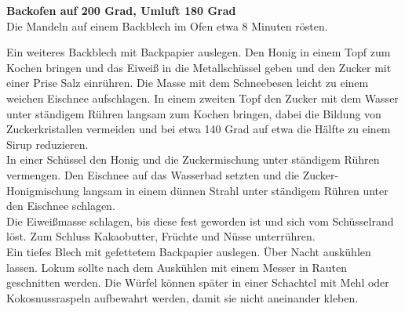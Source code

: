 \vspace*{\fill}
\begin{multicols}{2}


\textbf{Backofen auf 200 Grad, Umluft 180 Grad}\\
Die Mandeln auf einem Backblech im Ofen etwa 8 Minuten rösten. 

Ein weiteres Backblech mit Backpapier auslegen. 
Den Honig in einem Topf zum Kochen bringen und das Eiweiß in die Metallschüssel 
geben und den Zucker mit einer Prise Salz einrühren. 
Die Masse mit dem Schneebesen leicht zu einem weichen Eischnee aufschlagen. In einem zweiten Topf den Zucker 
mit dem Wasser unter ständigem Rühren langsam zum Kochen bringen, 
dabei die Bildung von Zuckerkristallen vermeiden und bei etwa 140 Grad auf etwa die Hälfte zu einem Sirup reduzieren.\\
In einer Schüssel den Honig und die Zuckermischung unter ständigem Rühren vermengen.
Den Eischnee auf das Wasserbad setzten und die Zucker-Honigmischung langsam in einem dünnen Strahl unter ständigem Rühren unter den Eischnee schlagen.\\
Die Eiweißmasse schlagen, bis diese fest geworden ist und sich vom Schüsselrand löst.
Zum Schluss Kakaobutter, Früchte und Nüsse unterrühren. \\
Ein tiefes Blech mit gefettetem Backpapier auslegen.
Über Nacht auskühlen lassen. Lokum sollte nach dem Auskühlen mit einem Messer in Rauten geschnitten werden. 
Die Würfel können später in einer Schachtel mit Mehl oder Kokosnussraspeln aufbewahrt werden, 
damit sie nicht aneinander kleben.

\end{multicols}
\vfill
